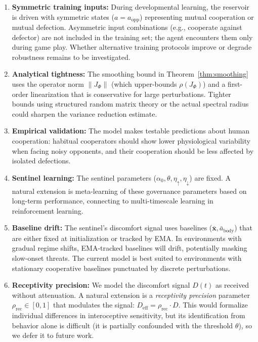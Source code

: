 \documentclass[11pt,a4paper]{article}
\theoremstyle{definition}
\newcommand{\xstate}{\mathbf{x}}
\begin{document}
\begin{enumerate}[label=(\roman*)]
  \item \textbf{Symmetric training inputs:}  During developmental learning,
    the reservoir is driven with symmetric states ($a = a_{\mathrm{opp}}$)
    representing mutual cooperation or mutual defection.  Asymmetric
    input combinations (e.g., cooperate against defector) are not included
    in the training set; the agent encounters them only during game play.
    Whether alternative training protocols improve or degrade robustness
    remains to be investigated.

  \item \textbf{Analytical tightness:}  The smoothing bound in
    Theorem~\ref{thm:smoothing} uses the operator norm $\|J_\Phi\|$
    (which upper-bounds $\rho(J_\Phi)$) and a first-order linearization
    that is conservative for large perturbations.  Tighter bounds using
    structured random matrix theory or the actual spectral radius
    could sharpen the variance reduction estimate.

  \item \textbf{Empirical validation:}  The model makes testable predictions
    about human cooperation: habitual cooperators should show lower
    physiological variability when facing noisy opponents, and their
    cooperation should be less affected by isolated defections.

  \item \textbf{Sentinel learning:}  The sentinel parameters
    ($\alpha_0, \theta, \eta_{\uparrow}, \eta_{\downarrow}$) are fixed.
    A natural extension is meta-learning of these governance parameters
    based on long-term performance, connecting to multi-timescale learning
    in reinforcement learning.

  \item \textbf{Baseline drift:}  The sentinel's discomfort signal uses
    baselines ($\bar{\xstate}, \bar{a}_{\mathrm{body}}$) that are either
    fixed at initialization or tracked by EMA.  In environments with
    gradual regime shifts, EMA-tracked baselines will drift, potentially
    masking slow-onset threats.  The current model is best suited to
    environments with stationary cooperative baselines punctuated by
    discrete perturbations.

  \item \textbf{Receptivity precision:}  We model the discomfort signal
    $D(t)$ as received without attenuation.  A natural extension is a
    \emph{receptivity precision} parameter $\rho_{\mathrm{rec}} \in [0,1]$
    that modulates the signal: $D_{\mathrm{eff}} = \rho_{\mathrm{rec}} \cdot D$.
    This would formalize individual differences in interoceptive sensitivity,
    but its identification from behavior alone is difficult (it is partially
    confounded with the threshold $\theta$), so we defer it to future work.
\end{enumerate}
\end{document}

